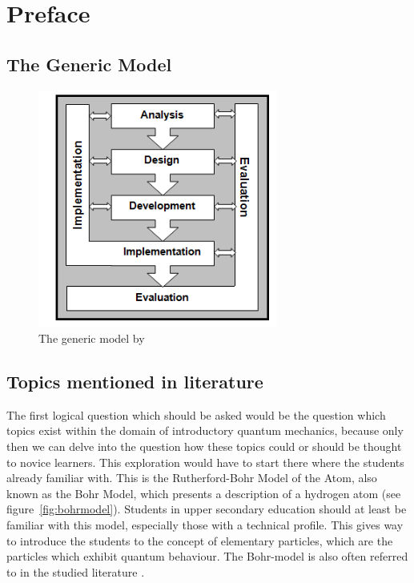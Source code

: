 \documentclass[11pt,twoside]{report} %
\begin{document}
\section{Preface}


\subsection{The Generic Model}

\begin{figure}[h]
\centering
\includegraphics[width=0.7\textwidth]{genericmodel}
\caption{\footnotesize The generic model by \protect{}\label{fig:genericmodel}}
\end{figure}

\subsection{Topics mentioned in literature}

The first logical question which should be asked would be the question which topics exist within the domain of introductory quantum mechanics, because only then we can delve into the question how these topics could or should be thought to novice learners. This exploration would have to start there where the students already familiar with. This is the Rutherford-Bohr Model of the Atom, also known as the Bohr Model, which presents a description of a hydrogen atom (see figure~\ref{fig:bohrmodel}). Students in upper secondary education should at least be familiar with this model, especially those with a technical profile. This gives way to introduce the students to the concept of elementary particles, which are the particles which exhibit quantum behaviour. The Bohr-model is also often referred to in the studied literature \cite{dori, mckagan, muller, papaphotis1, papaphotis2}.
\end{document}

